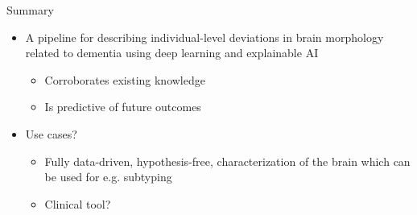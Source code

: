\documentclass[t]{beamer}
\begin{document}
	\begin{frame}{Summary}
		\vfill
		\centering
		\begin{itemize}
			\item A pipeline for describing individual-level deviations in brain morphology related to dementia using deep learning and explainable AI
			\begin{itemize}
				\item Corroborates existing knowledge
				\item Is predictive of future outcomes
			\end{itemize}
			\item Use cases?
			\begin{itemize}
				\item Fully data-driven, hypothesis-free, characterization of the brain which can be used for e.g. subtyping
				\item Clinical tool?
			\end{itemize}
		\end{itemize}
		\vfill
	\end{frame}
\end{document}
